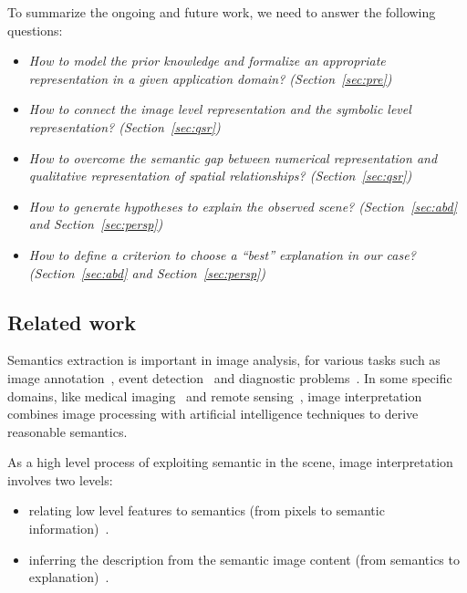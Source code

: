 \documentclass{article}
\begin{document}
To summarize the ongoing and future work, we need to answer the following questions:
\begin{itemize}
 \item \textit{How to model the prior knowledge and formalize an appropriate representation in a given application domain? (Section~\ref{sec:pre})}
 \item \textit{How to connect the image level representation and the symbolic level representation? (Section~\ref{sec:qsr})}
 \item \textit{How to overcome the semantic gap between numerical representation and qualitative representation of spatial relationships? (Section~\ref{sec:qsr})}
 \item \textit{How to generate hypotheses to explain the observed scene? (Section~\ref{sec:abd} and Section~\ref{sec:persp})}
 \item \textit{How to define a criterion to choose a ``best'' explanation in our case? (Section~\ref{sec:abd} and Section~\ref{sec:persp})}
\end{itemize}

 \subsection{Related work}
Semantics extraction is important in image analysis, for various tasks such as image annotation~\cite{tousch2012semantic}, event detection~\cite{lavee2009understanding} and 
diagnostic problems~\cite{atif2014explanatory,atif2007grafip}.
In some specific domains, like medical imaging~\cite{atif2014explanatory,Bloch2005fuzzy,fouquier2012sequential,nempont2013constraint} and
remote sensing~\cite{forestier2012knowledge,vanegas2010detection}, image interpretation combines image processing with artificial intelligence techniques to derive reasonable semantics.  

As a high level process of exploiting semantic in the scene, image interpretation involves two levels:
\begin{itemize}
 \item relating low level features to semantics (from pixels to semantic information)~\cite{Bloch2005fuzzy,fouquier2012sequential,Hudelot2008fuzzy,nempont2013constraint}.
 \item inferring the description from the semantic image content (from semantics to explanation)~\cite{atif2014explanatory,Espinosa07multimedia}.
\end{itemize}
\end{document}
